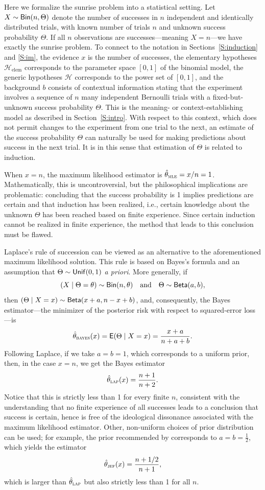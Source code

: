 \documentclass[a4paper, 12pt]{article}
\theoremstyle{plain}
\theoremstyle{definition}
\theoremstyle{remark}
\newcommand{\E}{\mathsf{E}}
\newcommand{\bin}{{\sf Bin}}
\newcommand{\unif}{{\sf Unif}}
\newcommand{\bet}{{\sf Beta}}
\renewcommand{\H}{\mathcal{H}}
\begin{document}
Here we formalize the sunrise problem into a statistical setting. Let $X \sim \bin(n, \Theta)$ denote the number of successes in $n$ independent and identically distributed trials, with known number of trials $n$ and unknown success probability $\Theta$. If all $n$ observations are successes---meaning $X=n$---we have exactly the sunrise problem. To connect to the notation in Sections~\ref{S:induction} and \ref{S:im}, the evidence $x$ is the number of successes, the elementary hypotheses $\H_\text{elem}$ corresponds to the parameter space $[0,1]$ of the binomial model, the generic hypotheses $\H$ corresponds to the power set of $[0,1]$, and the background $b$ consists of contextual information stating that the experiment involves a sequence of $n$ many independent Bernoulli trials with a fixed-but-unknown success probability $\Theta$.  This is the meaning- or context-establishing model as described in Section~\ref{S:intro}. With respect to this context, which does not permit changes to the experiment from one trial to the next, an estimate of the success probability $\Theta$ can naturally be used for making predictions about success in the next trial. It is in this sense that estimation of $\Theta$ is related to induction.

When $x=n$, the maximum likelihood estimator is $\hat{\theta}_\text{\sc mle}=x/n=1$. Mathematically, this is uncontroversial, but the philosophical implications are problematic: concluding that the success probability is 1 implies predictions are certain and that induction has been realized, i.e., certain knowledge about the unknown $\Theta$ has been reached based on finite experience.  Since certain induction cannot be realized in finite experience, the method that leads to this conclusion must be flawed. 

Laplace's rule of succession \citep{laplace.essai, zabell1989.rule} can be viewed as an alternative to the aforementioned maximum likelihood solution.  This rule is based on Bayes's formula and an assumption that $\Theta \sim \unif(0,1)$ {\em a priori}.  More generally, if 
\[ (X \mid \Theta=\theta) \sim \bin(n,\theta) \quad \text{and} \quad \Theta \sim \bet(a,b), \]
then $(\Theta \mid X=x) \sim \bet(x+a, n-x+b)$, and, consequently, the Bayes estimator---the minimizer of the posterior risk with respect to squared-error loss---is
\[ \hat\theta_\text{\sc bayes}(x) = \E(\Theta \mid X=x) = \frac{x + a}{n + a + b}. \]
Following Laplace, if we take $a=b=1$, which corresponds to a uniform prior, then, in the case $x=n$, we get the Bayes estimator 
\[ \hat\theta_\text{\sc lap}(x) = \frac{n+1}{n+2}. \]
Notice that this is strictly less than 1 for every finite $n$, consistent with the understanding that no finite experience of all successes leads to a conclusion that success is certain, hence is free of the ideological dissonance associated with the maximum likelihood estimator.  Other, non-uniform choices of prior distribution can be used; for example, the prior recommended by \citet{jeffreys1946} corresponds to $a=b=\frac12$, which yields the estimator 
\[ \hat\theta_\text{\sc jef}(x) = \frac{n+1/2}{n+1}, \]
which is larger than $\hat\theta_\text{\sc lap}$ but also strictly less than 1 for all $n$. 
\end{document}
